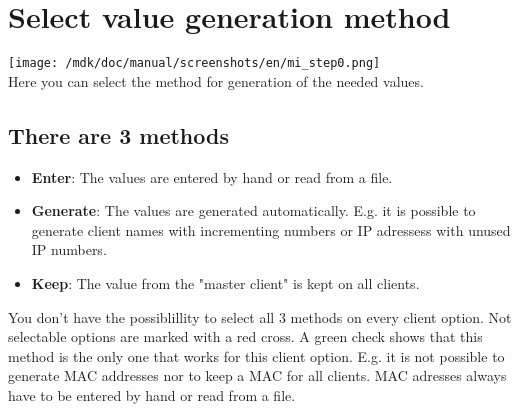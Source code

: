 \section{Select value generation method}
\texttt{[image: /mdk/doc/manual/screenshots/en/mi\_step0.png]} \\
Here you can select the method for generation of the needed values.\\
\subsection{There are 3 methods}
\begin{itemize}
\item \textbf{Enter}: The values are entered by hand or read from a file.\\
\item \textbf{Generate}: The values are generated automatically. E.g. it is possible to generate client names with incrementing numbers or IP adressess with unused IP numbers.\\
\item \textbf{Keep}: The value from the "master client" is kept on all clients.\\
\end{itemize}
You don't have the possiblillity to select all 3 methods on every client option. Not selectable options are marked with a red cross. A green check shows that this method is the only one that works for this client option. E.g. it is not possible to generate MAC addresses nor to keep a MAC for all clients. MAC adresses always have to be entered by hand or read from a file.\\
